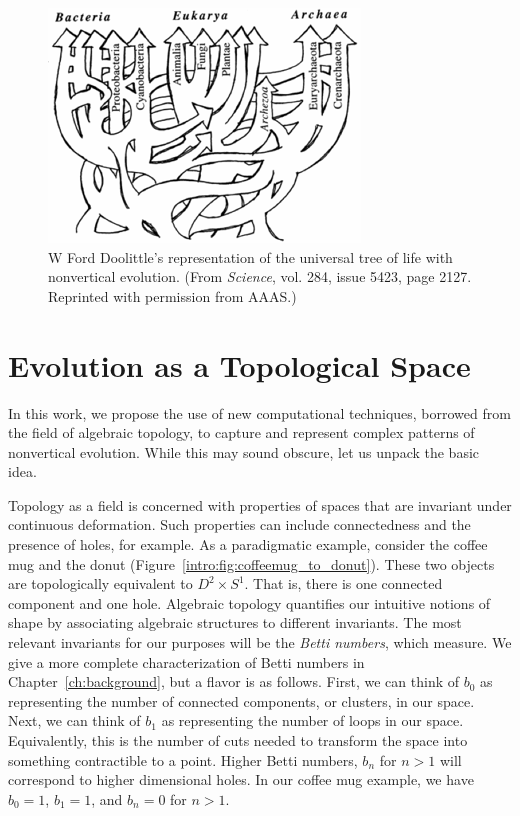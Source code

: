 \begin{figure}
\centering
\includegraphics[width=.8\columnwidth]{./fig/introduction/doolittle_tree.png}
\caption[Ford Doolittle's Tree]{W Ford Doolittle's representation of the universal tree of life with nonvertical evolution. (From \emph{Science}, vol. 284, issue 5423, page 2127. Reprinted with permission from AAAS.)}
\label{fig:doolittle_tree}
\end{figure}

\section{Evolution as a Topological Space}

In this work, we propose the use of new computational techniques, borrowed from the field of algebraic topology, to capture and represent complex patterns of nonvertical evolution.
While this may sound obscure, let us unpack the basic idea.

Topology as a field is concerned with properties of spaces that are invariant under continuous deformation.
Such properties can include connectedness and the presence of holes, for example.
As a paradigmatic example, consider the coffee mug and the donut (Figure~\ref{intro:fig:coffeemug_to_donut}).
These two objects are topologically equivalent to $D^2\times S^1$.
That is, there is one connected component and one hole.
Algebraic topology quantifies our intuitive notions of shape by associating algebraic structures to different invariants.
The most relevant invariants for our purposes will be the \emph{Betti numbers}, which measure.
We give a more complete characterization of Betti numbers in Chapter~\ref{ch:background}, but a flavor is as follows.
First, we can think of $b_0$ as representing the number of connected components, or clusters, in our space.
Next, we can think of $b_1$ as representing the number of loops in our space.
Equivalently, this is the number of cuts needed to transform the space into something contractible to a point.
Higher Betti numbers, $b_n$ for $n>1$ will correspond to higher dimensional holes.
In our coffee mug example, we have $b_0=1$, $b_1=1$, and $b_n=0$ for $n>1$.

